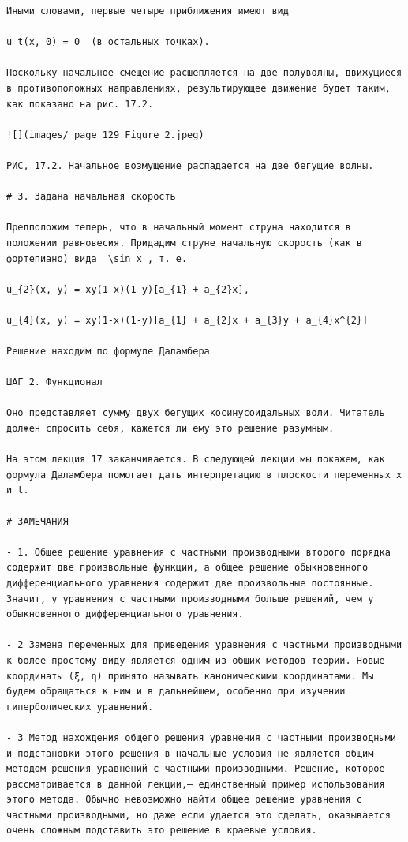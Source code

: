 \documentclass[
  ukrainian,
]{article}
\begin{document}
\begin{verbatim}
Иными словами, первые четыре приближения имеют вид

u_t(x, 0) = 0  (в остальных точках).

Поскольку начальное смещение расшепляется на две полуволны, движущиеся в противоположных направлениях, результирующее движение будет таким, как показано на рис. 17.2.

![](images/_page_129_Figure_2.jpeg)

РИС, 17.2. Начальное возмущение распадается на две бегущие волны.

# 3. Задана начальная скорость

Предположим теперь, что в начальный момент струна находится в положении равновесия. Придадим струне начальную скорость (как в фортепиано) вида  \sin x , т. е.

u_{2}(x, y) = xy(1-x)(1-y)[a_{1} + a_{2}x],

u_{4}(x, y) = xy(1-x)(1-y)[a_{1} + a_{2}x + a_{3}y + a_{4}x^{2}]

Решение находим по формуле Даламбера

ШАГ 2. Функционал

Оно представляет сумму двух бегущих косинусоидальных воли. Читатель должен спросить себя, кажется ли ему это решение разумным.

На этом лекция 17 заканчивается. В следующей лекции мы покажем, как формула Даламбера помогает дать интерпретацию в плоскости переменных x и t.

# ЗАМЕЧАНИЯ

- 1. Общее решение уравнения с частными производными второго порядка содержит две произвольные функции, а общее решение обыкновенного дифференциального уравнения содержит две произвольные постоянные. Значит, у уравнения с частными производными больше решений, чем у обыкновенного дифференциального уравнения.

- 2 Замена переменных для приведения уравнения с частными производными к более простому виду является одним из общих методов теории. Новые координаты (ξ, η) принято называть каноническими координатами. Мы будем обращаться к ним и в дальнейшем, особенно при изучении гиперболических уравнений.

- 3 Метод нахождения общего решения уравнения с частными производными и подстановки этого решения в начальные условия не является общим методом решения уравнений с частными производными. Решение, которое рассматривается в данной лекции,— единственный пример использования этого метода. Обычно невозможно найти общее решение уравнения с частными производными, но даже если удается это сделать, оказывается очень сложным подставить это решение в краевые условия.


\end{verbatim}
\end{document}
